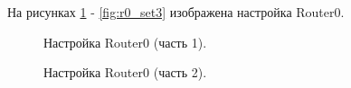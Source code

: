 \documentclass[a4paper,14pt]{article}
\begin{document}
\newpage
На рисунках \ref{fig:r0_set} - \ref{fig:r0_set3} изображена настройка Router0.


\begin{figure}[!h]
    \caption{Настройка Router0 (часть 1).}
    \label{fig:r0_set}
\end{figure}

\newpage
\begin{figure}[!h]
    \caption{Настройка Router0 (часть 2).}
    \label{fig:r0_set2}
\end{figure}
\end{document}
